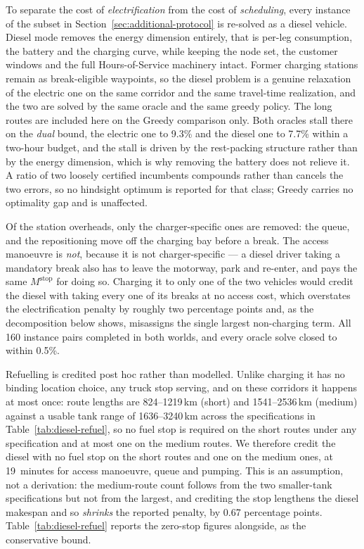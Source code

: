 To separate the cost of \emph{electrification} from the cost of
\emph{scheduling}, every instance of the subset in
Section~\ref{sec:additional-protocol} is re-solved as a diesel vehicle.  Diesel
mode removes the energy dimension entirely, that is per-leg consumption, the
battery and the charging curve, while keeping the node set, the customer windows
and the full Hours-of-Service machinery intact.  Former charging stations remain
as break-eligible waypoints, so the diesel problem is a genuine relaxation of
the electric one on the same corridor and the same travel-time realization, and
the two are solved by the same oracle and the same greedy policy.  The long
routes are included here on the Greedy comparison only.  Both oracles stall
there on the \emph{dual} bound, the electric one to 9.3\% and the diesel one
to 7.7\% within a two-hour budget, and the stall is driven by the rest-packing
structure rather than by the energy dimension, which is why removing the
battery does not relieve it.  A ratio of two loosely certified incumbents
compounds rather than cancels the two errors, so no hindsight optimum is
reported for that class; Greedy carries no optimality gap and is unaffected.

Of the station overheads, only the charger-specific ones are removed: the
queue, and the repositioning move off the charging bay before a break.  The
access manoeuvre is \emph{not}, because it is not charger-specific --- a diesel
driver taking a mandatory break also has to leave the motorway, park and
re-enter, and pays the same $M^{\text{stop}}$ for doing so.  Charging it to
only one of the two vehicles would credit the diesel with taking every one of
its breaks at no access cost, which overstates the electrification penalty by
roughly two percentage points and, as the decomposition below shows, misassigns
the single largest non-charging term.  All 160 instance pairs completed in both
worlds, and every oracle solve closed to within 0.5\%.

Refuelling is credited post hoc rather than modelled.  Unlike charging it has
no binding location choice, any truck stop serving, and on these corridors it
happens at most once: route lengths are 824--1219\,km (short) and
1541--2536\,km (medium) against a usable tank range of 1636--3240\,km across
the specifications in Table~\ref{tab:diesel-refuel}, so no fuel stop is
required on the short routes under any specification and at most one on the
medium routes.  We therefore credit the diesel with no fuel stop on the short
routes and one on the medium ones, at 19~minutes for access manoeuvre, queue
and pumping.  This is an assumption, not a derivation: the medium-route count
follows from the two smaller-tank specifications but not from the largest, and
crediting the stop lengthens the diesel makespan and so \emph{shrinks} the
reported penalty, by 0.67 percentage points.  Table~\ref{tab:diesel-refuel}
reports the zero-stop figures alongside, as the conservative bound.

